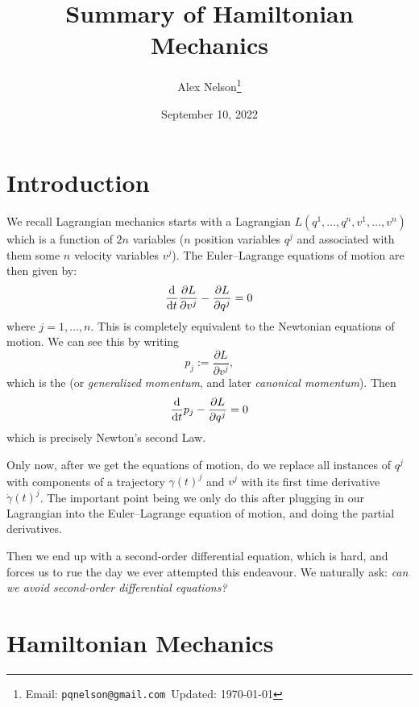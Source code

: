 \title{Summary of Hamiltonian Mechanics}
\author{Alex Nelson\footnote{Email: \texttt{pqnelson@gmail.com}\hfil\break\indent\;\,  Updated: \today}}
\date{September 10, 2022}
\maketitle

\section{Introduction}

We recall Lagrangian mechanics starts with a Lagrangian
$L(q^{1},\dots,q^{n},v^{1},\dots,v^{n})$ which is a function of $2n$
variables ($n$ position variables $q^{j}$ and associated with them some
$n$ velocity variables $v^{j}$). The Euler--Lagrange equations of motion
are then given by:
\begin{equation}
\frac{\mathrm{d}}{\mathrm{d} t}\frac{\partial L}{\partial v^{j}} - \frac{\partial L}{\partial q^{j}} = 0
\end{equation}
where $j=1,\dots,n$. This is completely equivalent to the Newtonian
equations of motion. We can see this by writing
\begin{equation}
p_{j} := \frac{\partial L}{\partial v^{j}},
\end{equation}
which is the  (or \emph{generalized momentum},
and later \emph{canonical momentum}). Then
\begin{equation}
\frac{\mathrm{d}}{\mathrm{d} t}p_{j} - \frac{\partial L}{\partial q^{j}} = 0
\end{equation}
which is precisely Newton's second Law.

\M
Only now, after we get the equations of motion, do we replace all
instances of $q^{j}$ with components of a trajectory $\gamma(t)^{j}$ and
$v^{j}$ with its first time derivative $\dot\gamma(t)^{j}$. The
important point being we only do this after plugging in our Lagrangian
into the Euler--Lagrange equation of motion, and doing the partial
derivatives.

Then we end up with a second-order differential equation, which is hard,
and forces us to rue the day we ever attempted this endeavour. We
naturally ask: \emph{can we avoid second-order differential equations?}

\section{Hamiltonian Mechanics}

